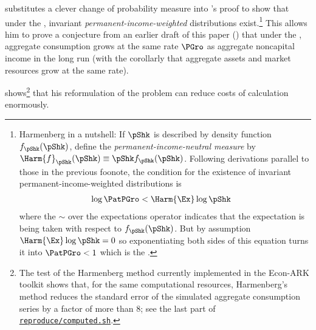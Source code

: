 \documentclass[BufferStockTheory]{subfiles}
\begin{document}
\hypertarget{Growth-Rates-of-Aggregate-Income-and-Consumption}{}

\cite{harmenbergInvariant} substitutes a clever change of probability measure into \cite{szeidlInvariant}'s proof to show that under the {\GIC}, invariant \emph{permanent-income-weighted} distributions exist.\footnote{Harmenberg in a nutshell:  If $\pShk$ is described by density function $f_\pShk(\pShk)$, define the \emph{permanent-income-neutral measure} by $\Harm{f}_\pShk(\pShk) \equiv \pShk f_\pShk(\pShk)$.  Following derivations parallel to those in the previous foonote, the condition for the existence of invariant permanent-income-weighted distributions is
  \begin{align*}
\log \PatPGro  & < \Harm{\Ex} \log \pShk
  \end{align*}
  where the $\sim$ over the expectations operator indicates that the expectation is being taken with respect to $f_\pShk(\pShk)$.  But by assumption $\Harm{\Ex} \log \pShk = 0$ so exponentiating both sides of this equation turns it into $\PatPGro < 1$ which is the {\GIC}.}  This allows him to prove a conjecture from an earlier draft of this paper (\cite{BufferStockTheoryQESubmit}) that under the {\GIC}, aggregate consumption grows at the same rate $\PGro$ as aggregate noncapital income in the long run (with the corollarly that aggregate assets and market resources grow at the same rate).


\cite{harmenbergInvariant} shows\footnote{The test of the Harmenberg method currently implemented in the Econ-ARK toolkit shows that, for the same computational resources, Harmenberg's method reduces the standard error of the simulated aggregate consumption series by a factor of more than 8; see the last part of \href{https://github.com/econ-ark/BufferStockTheory/blob/master/reproduce/computed.sh}{\texttt{reproduce/computed.sh}}.} that his reformulation of the problem can reduce costs of calculation enormously.  %
\end{document}

